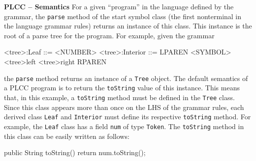 \begin{minipage}[t]{\sw}
\slidenumber
\LARGE
{\bf PLCC -- Semantics}\exx
For a given ``program'' in the language defined by the grammar,
the \verb'parse' method of the start symbol class
(the first nonterminal in the language grammar rules)
returns an instance of this class.
This instance is the root of a parse tree for the program.
For example, given the grammar
{\Large
\begin{qv}
<tree>:Leaf     ::= <NUMBER>
<tree>:Interior ::= LPAREN <SYMBOL> <tree>left <tree>right RPAREN
\end{qv}
}
the \verb'parse' method returns an instance of a \verb'Tree' object.\exx
The default semantics of a PLCC program is
to return the \verb'toString' value of this instance.
This means that, in this example,
a \verb'toString' method must be defined
in the \verb'Tree' class.
Since this class appears more than once on the LHS of the grammar rules,
each derived class \verb'Leaf' and \verb'Interior' must define
its respective \verb'toString' method.\exx
For example, the \verb'Leaf' class has a field \verb'num'
of type \verb'Token'.
The \verb'toString' method in this class can be easily written as follows:
{\Large
\begin{qv}
public String toString() {
    return num.toString();
}
\end{qv}
}
\end{minipage}
\clearpage
